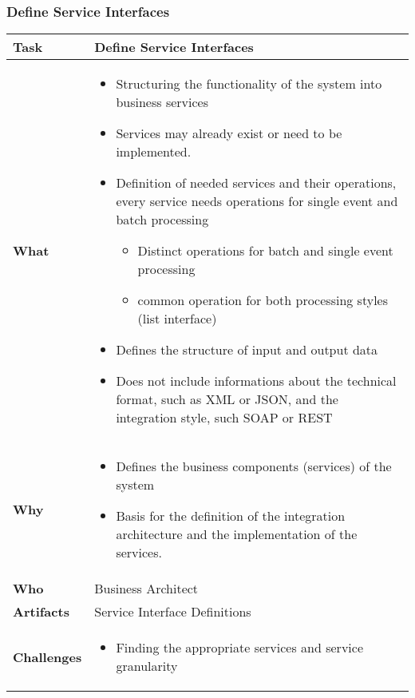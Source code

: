 \subsubsection{Define Service Interfaces}
\begin{minipage}{\textwidth}
 \label{table:ch6_Task_Define_Service_Interfaces}
\begin{tabular}
	{|m{3cm}|m{10cm}|} \hline \bfseries Task & Define Service Interfaces\\
	\hline \bfseries What & 
	\begin{itemize}
		\item Structuring the functionality of the system into business services
		\item Services may already exist or need to be implemented.
		\item Definition of needed services and their operations, every service needs operations for single event and batch processing
		\begin{itemize}
			\item Distinct operations for batch and single event processing
			\item common operation for both processing styles (list interface)
		\end{itemize}
		\item Defines the structure of input and output data
		\item Does not include informations about the technical format, such as \ac{XML} or \ac{JSON}, and the integration style, such SOAP or \ac{REST}
	\end{itemize}
	\\
	\hline \bfseries Why &
	\begin{itemize}
		\item Defines the business components (services) of the system
		\item Basis for the definition of the integration architecture and the implementation of the services.
	\end{itemize}\\
	\hline \bfseries Who & Business Architect\\
	\hline \bfseries Artifacts & Service Interface Definitions\\
	\hline \bfseries Challenges & 
	\begin{itemize}
		\item Finding the appropriate services and service granularity
	\end{itemize}\\
	\hline 
\end{tabular}
\end{minipage}

